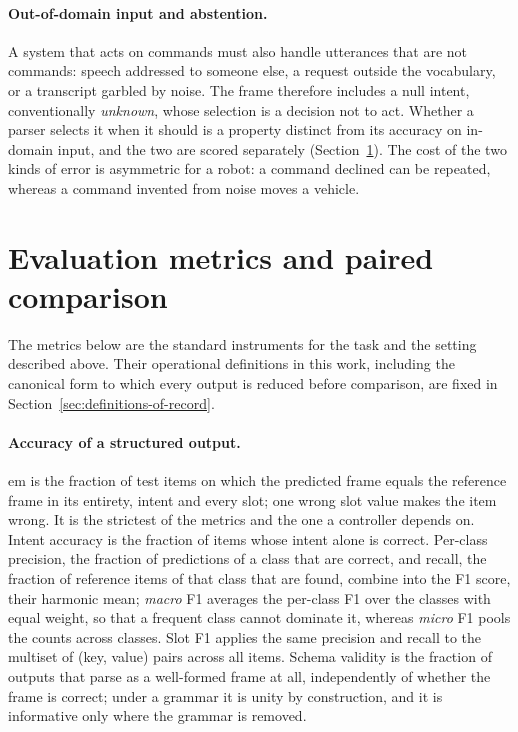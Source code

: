 \paragraph{Out-of-domain input and abstention.} A system that acts on commands must also handle
utterances that are not commands: speech addressed to someone else, a request outside the
vocabulary, or a transcript garbled by noise. The frame therefore includes a null intent,
conventionally \emph{unknown}, whose selection is a decision not to act. Whether a parser
selects it when it should is a property distinct from its accuracy on in-domain input, and the
two are scored separately (Section~\ref{sec:bg-metrics}). The cost of the two kinds of error is
asymmetric for a robot: a command declined can be repeated, whereas a command invented from
noise moves a vehicle.

\clearpage
\section{Evaluation metrics and paired comparison}
\label{sec:bg-metrics}

The metrics below are the standard instruments for the task and the setting described above.
Their operational definitions in this work, including the canonical form to which every output
is reduced before comparison, are fixed in Section~\ref{sec:definitions-of-record}.

\paragraph{Accuracy of a structured output.} \Gls{em} is the fraction of test items on which the
predicted frame equals the reference frame in its entirety, intent and every slot; one wrong slot
value makes the item wrong. It is the strictest of the metrics and the one a controller depends
on. Intent accuracy is the fraction of items whose intent alone is correct. Per-class precision,
the fraction of predictions of a class that are correct, and recall, the fraction of reference
items of that class that are found, combine into the F1 score, their harmonic mean; \emph{macro}
F1 averages the per-class F1 over the classes with equal weight, so that a frequent class cannot
dominate it, whereas \emph{micro} F1 pools the counts across classes. Slot F1 applies the same
precision and recall to the multiset of (key, value) pairs across all items. Schema validity is
the fraction of outputs that parse as a well-formed frame at all, independently of whether the
frame is correct; under a grammar it is unity by construction, and it is informative only where
the grammar is removed.

